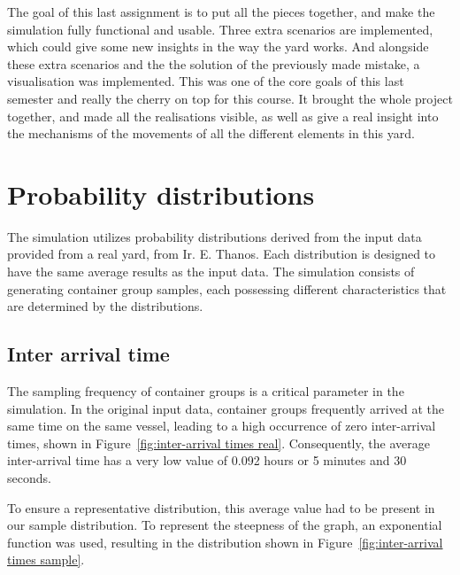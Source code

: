 \documentclass{article}
\begin{document}
The goal of this last assignment is to put all the pieces together, and make
the simulation fully functional and usable. Three extra scenarios are
implemented, which could give some new insights in the way the yard works. And
alongside these extra scenarios and the the solution of the previously made
mistake, a visualisation was implemented. This was one of the core goals of
this last semester and really the cherry on top for this course. It brought the
whole project together, and made all the realisations visible, as well as give
a real insight into the mechanisms of the movements of all the different
elements in this yard.

\section{Probability distributions}
The simulation utilizes probability distributions derived from the input data
provided from a real yard, from Ir. E. Thanos. Each distribution is designed to
have the same average results as the input data. The simulation consists of
generating container group samples, each possessing different characteristics
that are determined by the distributions.

\subsection{Inter arrival time}
The sampling frequency of container groups is a critical parameter in the
simulation. In the original input data, container groups frequently arrived at
the same time on the same vessel, leading to a high occurrence of zero
inter-arrival times, shown in Figure~\ref{fig:inter-arrival times real}.
Consequently, the average inter-arrival time has a very low value of 0.092
hours or 5 minutes and 30 seconds.

To ensure a representative distribution, this average value had to be present
in our sample distribution. To represent the steepness of the graph, an
exponential function was used, resulting in the distribution shown in
Figure~\ref{fig:inter-arrival times sample}.
\end{document}
